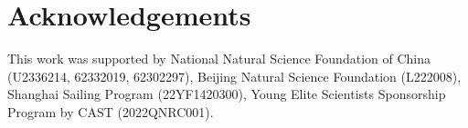 \section*{Acknowledgements}


This work was supported by National Natural Science Foundation of China (U2336214, 62332019, 62302297), Beijing Natural Science Foundation (L222008), Shanghai Sailing Program (22YF1420300), Young Elite Scientists Sponsorship Program by CAST (2022QNRC001).

